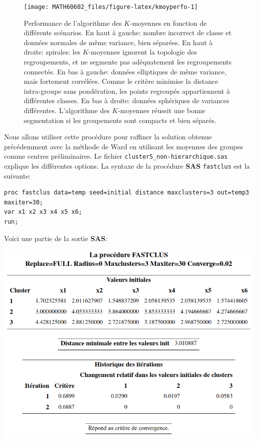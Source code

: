 \documentclass[
  11pt,
  letterpaper,
]{book}
\theoremstyle{definition}
\theoremstyle{definition}
\theoremstyle{definition}
\theoremstyle{remark}
\begin{document}
\begin{figure}

{\centering \texttt{[image: MATH60602\_files/figure-latex/kmoyperfo-1]} 

}

\caption{Performance de l'algorithme des $K$-moyennes en fonction de différents scénarios. En haut à gauche: nombre incorrect de classe et données normales de même variance, bien séparées. En haut à droite: spirales: les $K$-moyennes ignorent la topologie des regroupements, et ne segmente pas adéquatement les regroupements connectés. En bas à gauche: données elliptiques de même variance, mais fortement corrélées. Comme le critère minimise la distance intra-groupe sans pondération, les points regroupés appartiennent à différentes classes. En bas à droite: données sphériques de variances différentes. L'algorithme des $K$-moyennes réussit une bonne segmentation si les groupements sont compacts et bien séparés.}\label{fig:kmoyperfo}
\end{figure}

Nous allons utiliser cette procédure pour raffiner la solution obtenue précédemment avec la méthode de Ward en utilisant les moyennes des groupes comme centres préliminaires. Le fichier \texttt{cluster5\_non-hierarchique.sas} explique les différentes options. La syntaxe de la procédure \textbf{SAS} \texttt{fastclus} est la suivante:

\begin{verbatim}
proc fastclus data=temp seed=initial distance maxclusters=3 out=temp3 maxiter=30;
var x1 x2 x3 x4 x5 x6;
run;
\end{verbatim}

Voici une partie de la sortie \textbf{SAS}:

\begin{center}\includegraphics[width=0.7\linewidth]{figures/04-clustering-e14} \end{center}
\end{document}
